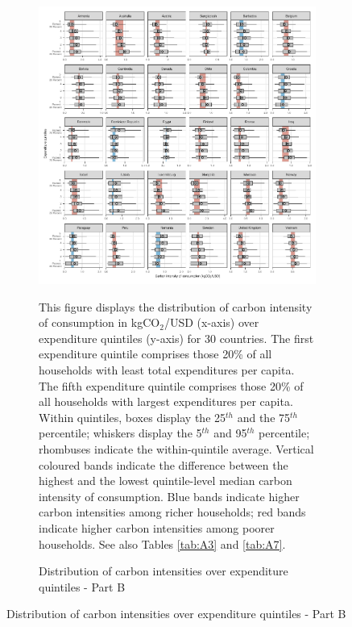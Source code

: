 \clearpage

\begin{figure}[ht!]\ContinuedFloat
   \begin{subfigure}[b]{\textwidth}
  \centering
      \caption{Distribution of carbon intensities over expenditure quintiles - Part B} \label{fig:Quint_B}
  \includegraphics{1_Figures/Figures_Appendix/Figure_1_2017_Appendix_2}
  \begin{subcaption2}
    This figure displays the distribution of carbon intensity of consumption in kgCO$_{2}$/USD (x-axis) over expenditure quintiles (y-axis) for 30 countries. The first expenditure quintile comprises those 20\% of all households with least total expenditures per capita. The fifth expenditure quintile comprises those 20\% of all households with largest expenditures per capita. Within quintiles, boxes display the 25$^{th}$ and the 75$^{th}$ percentile; whiskers display the 5$^{th}$ and 95$^{th}$ percentile; rhombuses indicate the within-quintile average. Vertical coloured bands indicate the difference between the highest and the lowest quintile-level median carbon intensity of consumption. Blue bands indicate higher carbon intensities among richer households; red bands indicate higher carbon intensities among poorer households. See also Tables \ref{tab:A3} and \ref{tab:A7}.
  \end{subcaption2}
\end{subfigure}
\end{figure}

